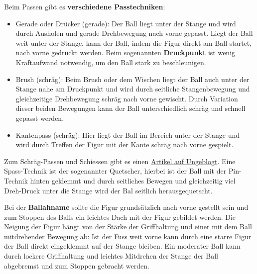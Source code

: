 Beim Passen gibt es \textbf{verschiedene Passtechniken}:
\begin{itemize}
    \item Gerade oder Drücker (gerade): Der Ball liegt unter der Stange und wird durch Ausholen und gerade Drehbewegung nach vorne gepasst. 
        Liegt der Ball weit unter der Stange, kann der Ball, indem die Figur direkt am Ball startet, nach vorne gedrückt werden. 
        Beim sogenannten \textbf{Druckpunkt} ist wenig Kraftaufwand notwendig, um den Ball stark zu beschleunigen.
    \item Brush (schräg): Beim Brush oder dem Wischen liegt der Ball auch unter der Stange nahe am Druckpunkt und wird durch seitliche Stangenbewegung und gleichzeitige Drehbewegung schräg nach vorne gewischt.  
        Durch Variation dieser beiden Bewegungen kann der Ball unterschiedlich schräg und schnell gepasst werden.
    \item Kantenpass (schräg): Hier liegt der Ball im Bereich unter der Stange und wird durch Treffen der Figur mit der Kante schräg nach vorne gespielt.
\end{itemize}
Zum Schräg-Passen und Schiessen gibt es einen \href{http://ungeblogtkickern.blogspot.de/2015/09/schrag-schieen.html}{Artikel auf Ungeblogt}.
Eine Spass-Technik ist der sogenannter Quetscher, hierbei ist der Ball mit der Pin-Technik hinten geklemmt und durch seitliches Bewegen und gleichzeitig viel Dreh-Druck unter die Stange wird der Bal seitlich herausgequetscht.

Bei der \textbf{Ballahname} sollte die Figur grundsätzlich nach vorne gestellt sein und zum Stoppen des Balls ein leichtes Dach mit der Figur gebildet werden. 
Die Neigung der Figur hängt von der Stärke der Griffhaltung und einer mit dem Ball mitdrehender Bewegung ab: 
Ist der Fuss weit vorne kann durch eine starre Figur der Ball direkt eingeklemmt auf der Stange bleiben.
Ein moderater Ball kann durch lockere Griffhaltung und leichtes Mitdrehen der Stange der Ball abgebremst und zum Stoppen gebracht werden.

